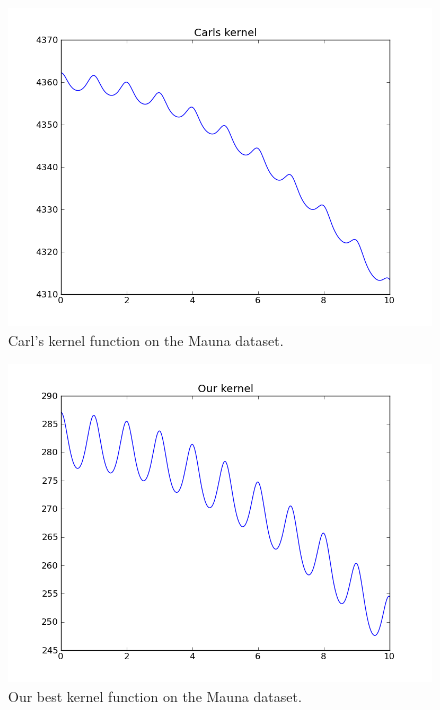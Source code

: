 \documentclass[twoside]{article}
\begin{document}
\begin{figure}
\includegraphics[width=\columnwidth]{../figures/carls_kernel}
\caption{Carl's kernel function on the Mauna dataset.}
\end{figure}

\begin{figure}
\includegraphics[width=\columnwidth]{../figures/our_kernel}
\caption{Our best kernel function on the Mauna dataset.}
\end{figure}

\end{document}
